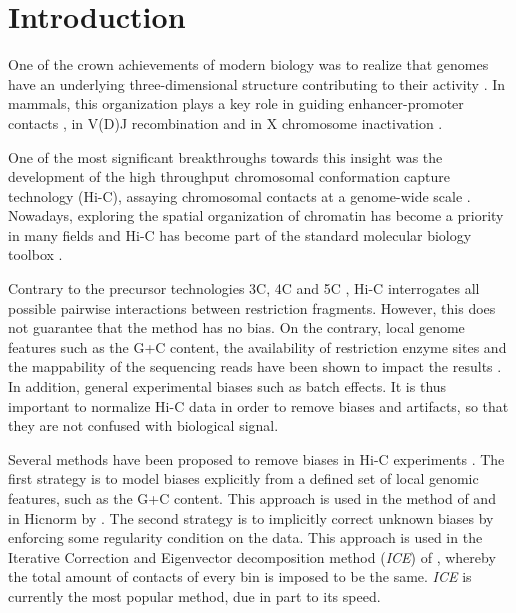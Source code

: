 \documentclass{bioinfo}
\begin{document}
\maketitle






\section{Introduction}

One of the crown achievements of modern biology was to realize that
genomes have an underlying three-dimensional structure contributing to
their activity \citep{rowley2016three}. In mammals, this organization
plays a key role in guiding enhancer-promoter contacts
\citep{de2013topology}, in V(D)J recombination \citep{choi2014ctcf} and in
X chromosome inactivation \citep{galupa2015x}.

One of the most significant breakthroughs towards this insight was the
development of the high throughput chromosomal conformation capture
technology (Hi-C), assaying chromosomal contacts at a genome-wide scale
\citep{lieberman2009comprehensive}. Nowadays, exploring the spatial
organization of chromatin has become a priority in many fields and Hi-C
has become part of the standard molecular biology toolbox
\citep{denker2016second}.

Contrary to the precursor technologies 3C, 4C and 5C \citep{de2012decade},
Hi-C interrogates all possible pairwise interactions between restriction
fragments. However, this does not guarantee that the method has no bias.
On the contrary, local genome features such as the G+C content, the
availability of restriction enzyme sites and the mappability of the
sequencing reads have been shown to impact the results
\citep{yaffe2011probabilistic}. In addition, general experimental biases
such as batch effects. It is thus important to normalize Hi-C data in
order to remove biases and artifacts, so that they are not confused with
biological signal.

Several methods have been proposed to remove biases in Hi-C experiments
\citep{schmitt2016genome}. The first strategy is to model biases
explicitly from a defined set of local genomic features, such as the G+C
content. This approach is used in the method of
\cite{yaffe2011probabilistic} and in Hicnorm by \cite{hu2012hicnorm}. The
second strategy is to implicitly correct unknown biases by enforcing some
regularity condition on the data. This approach is used in the
Iterative Correction and Eigenvector decomposition method (\textit{ICE})
of \cite{imakaev2012iterative}, whereby the total amount of contacts of
every bin is imposed to be the same. \textit{ICE} is currently the most
popular method, due in part to its speed.
\end{document}

